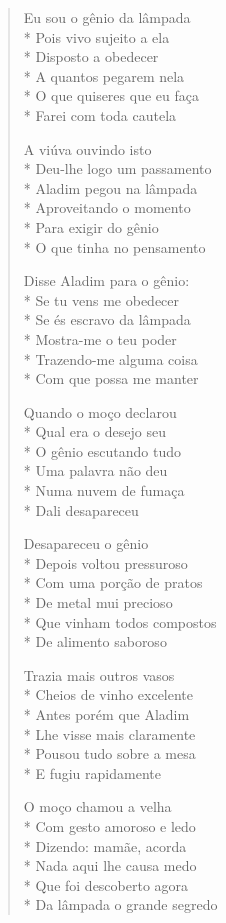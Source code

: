 \begin{verse}
Eu sou o gênio da lâmpada\\*
Pois vivo sujeito a ela\\*
Disposto a obedecer\\*
A quantos pegarem nela\\*
O que quiseres que eu faça\\*
Farei com toda cautela

A viúva ouvindo isto\\*
Deu-lhe logo um passamento\\*
Aladim pegou na lâmpada\\*
Aproveitando o momento\\*
Para exigir do gênio\\*
O que tinha no pensamento

Disse Aladim para o gênio:\\*
Se tu vens me obedecer\\*
Se és escravo da lâmpada\\*
Mostra-me o teu poder\\*
Trazendo-me alguma coisa\\*
Com que possa me manter

Quando o moço declarou\\*
Qual era o desejo seu\\*
O gênio escutando tudo\\*
Uma palavra não deu\\*
Numa nuvem de fumaça\\*
Dali desapareceu

Desapareceu o gênio\\*
Depois voltou pressuroso\\*
Com uma porção de pratos\\*
De metal mui precioso\\*
Que vinham todos compostos\\*
De alimento saboroso

Trazia mais outros vasos\\*
Cheios de vinho excelente\\*
Antes porém que Aladim\\*
Lhe visse mais claramente\\*
Pousou tudo sobre a mesa\\*
E fugiu rapidamente

O moço chamou a velha\\*
Com gesto amoroso e ledo\\*
Dizendo: mamãe, acorda\\*
Nada aqui lhe causa medo\\*
Que foi descoberto agora\\*
Da lâmpada o grande segredo


\end{verse}
